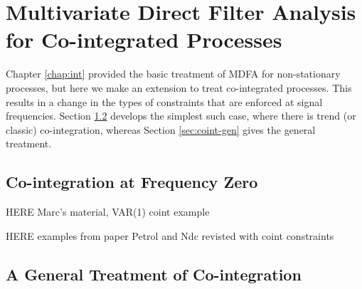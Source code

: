 \documentclass[a4paper]{book}
\def\eqinlaw{\stackrel{{\cal L}}{=}}
\def\tends{\rightarrow}
\def\tendsinf{\rightarrow\infty}
\def\isodynamo{\Leftrightarrow}
\begin{document}
\def\eqinlaw{\stackrel{{\cal L}}{=}}
\def\tends{\rightarrow}
\def\tendsinf{\rightarrow\infty}
\def\isodynamo{\Leftrightarrow}





\chapter{Multivariate Direct Filter Analysis for Co-integrated Processes}
\label{chap:coint}

Chapter \ref{chap:int} provided the basic treatment of MDFA for non-stationary
 processes, but here we make an extension to treat co-integrated processes.
 This results in a change in the types of constraints that are enforced
  at signal frequencies.  Section \ref{sec:coint-zero} develops the simplest such
  case, where there is trend (or classic) co-integration, whereas Section
  \ref{sec:coint-gen} gives the general treatment.
 
\section{Co-integration at Frequency Zero} 
 \label{sec:coint-zero}

HERE Marc's material, VAR(1) coint example

HERE examples from paper Petrol and Ndc revisted with coint constraints

\section{A General Treatment of Co-integration}
\label{sec:coint-zero}
 
\end{document}
